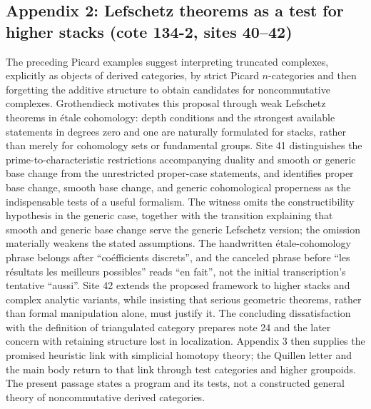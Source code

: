 \documentclass[10pt,oneside]{book}
\begin{document}
\subsection*{Appendix 2: Lefschetz theorems as a test for higher stacks (cote 134-2, sites 40--42)}
The preceding Picard examples suggest interpreting truncated complexes, explicitly as objects of derived categories, by strict Picard $n$-categories and then forgetting the additive structure to obtain candidates for noncommutative complexes. Grothendieck motivates this proposal through weak Lefschetz theorems in étale cohomology: depth conditions and the strongest available statements in degrees zero and one are naturally formulated for stacks, rather than merely for cohomology sets or fundamental groups. Site 41 distinguishes the prime-to-characteristic restrictions accompanying duality and smooth or generic base change from the unrestricted proper-case statements, and identifies proper base change, smooth base change, and generic cohomological properness as the indispensable tests of a useful formalism. The witness omits the constructibility hypothesis in the generic case, together with the transition explaining that smooth and generic base change serve the generic Lefschetz version; the omission materially weakens the stated assumptions. The handwritten étale-cohomology phrase belongs after ``coéfficients discrets'', and the canceled phrase before ``les résultats les meilleurs possibles'' reads ``en fait'', not the initial transcription's tentative ``aussi''. Site 42 extends the proposed framework to higher stacks and complex analytic variants, while insisting that serious geometric theorems, rather than formal manipulation alone, must justify it. The concluding dissatisfaction with the definition of triangulated category prepares note 24 and the later concern with retaining structure lost in localization. Appendix 3 then supplies the promised heuristic link with simplicial homotopy theory; the Quillen letter and the main body return to that link through test categories and higher groupoids. The present passage states a program and its tests, not a constructed general theory of noncommutative derived categories.
\end{document}
